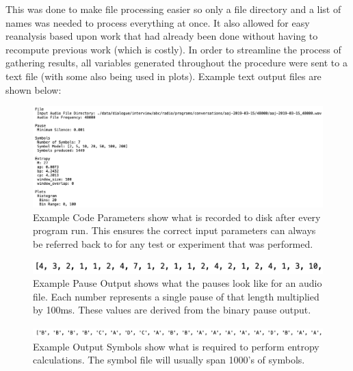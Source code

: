 This was done to make file processing easier so only a file directory and a list of names was needed to process everything at once. 
It also allowed for easy reanalysis based upon work that had already been done without having to recompute previous work (which is costly). 
In order to streamline the process of gathering results, all variables generated throughout the procedure were sent to a text file (with some also being used in plots). Example text output files are shown below: \\

\begin{figure}[h!]
	\center
	\includegraphics[scale=0.4]{src/main-matter/methodology/code-base/output/input_parameters}
	\caption{Example Code Parameters show what is recorded to disk after every program run. This ensures the correct input parameters can always be referred back to for any test or experiment that was performed.}
	\label{fig:parameters}
\end{figure}

\begin{figure}[h!]
	\center
	\includegraphics[scale=0.7]{src/main-matter/methodology/code-base/output/pauses}
	\caption{Example Pause Output shows what the pauses look like for an audio file. Each number represents a single pause of that length multiplied by 100ms. These values are derived from the binary pause output.}
	\label{fig:parameters}
\end{figure}

\begin{figure}[h!]
	\center
	\includegraphics[scale=0.5]{src/main-matter/methodology/code-base/output/output_symbols}
	\caption{Example Output Symbols show what is required to perform entropy calculations. The symbol file will usually span 1000's of symbols.}
	\label{fig:processing}
\end{figure}

